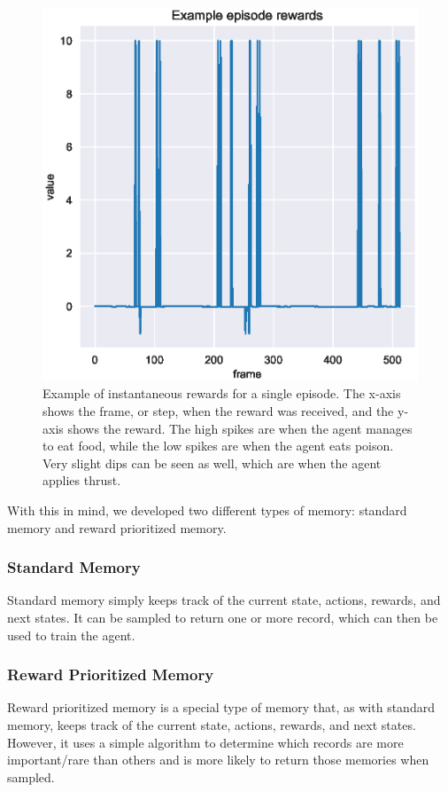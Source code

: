 \begin{figure}[htbp]
    \centering
    \includegraphics[scale=0.65]
    {./figures/example-episode-rewards}
    \caption{
        Example of instantaneous rewards for a single episode.
        The x-axis shows the frame, or step, when the reward was received, and the
        y-axis shows the reward.
        The high spikes are when the agent manages to eat food, while the low spikes
        are when the agent eats poison.
        Very slight dips can be seen as well, which are when the agent applies thrust.
    }
    \label{fig:example-episode-rewards}
\end{figure}

With this in mind, we developed two different types of memory: standard memory and
reward prioritized memory.

\subsubsection{Standard Memory}
Standard memory simply keeps track of the current state, actions, rewards, and next
states.
It can be sampled to return one or more record, which can then be used to train the
agent.

\subsubsection{Reward Prioritized Memory}
Reward prioritized memory is a special type of memory that, as with standard memory,
keeps track of the current state, actions, rewards, and next states.
However, it uses a simple algorithm to determine which records are more important/rare
than others and is more likely to return those memories when sampled.


